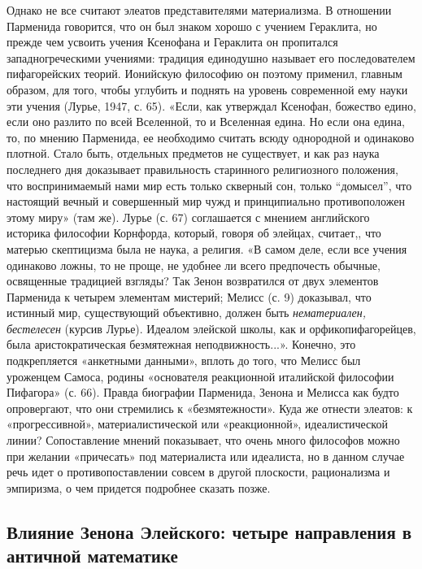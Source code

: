 Однако  не   все  считают  элеатов  представителями   материализма.  В
отношении  Парменида говорится,  что он  был знаком  хорошо с  учением
Гераклита,  но прежде  чем  усвоить учения  Ксенофана  и Гераклита  он
пропитался  западногреческими учениями:  традиция единодушно  называет
его  последователем  пифагорейских   теорий.  Ионийскую  философию  он
поэтому применил, главным образом, для  того, чтобы углубить и поднять
на  уровень современной  ему науки  эти учения  (Лурье, 1947,  с. 65).
«Если, как  утверждал Ксенофан,  божество едино,  если оно  разлито по
всей  Вселенной, то  и  Вселенная едина.  Но если  она  едина, то,  по
мнению Парменида,  ее необходимо считать всюду  однородной и одинаково
плотной.  Стало быть,  отдельных предметов  не существует,  и как  раз
наука последнего  дня доказывает правильность  старинного религиозного
положения,  что  воспринимаемый нами  мир  есть  только скверный  сон,
только  ``домысел'',  что  настоящий  вечный и  совершенный  мир  чужд
и  принципиально  противоположен  этому  миру»  (там  же).  Лурье  (с.
67) соглашается  с мнением  английского историка  философии Корнфорда,
который, говоря об элейцах, считает,,  что матерью скептицизма была не
наука,  а религия.  «В самом  деле, если  все учения  одинаково ложны,
то  не проще,  не  удобнее ли  всего  предпочесть обычные,  освященные
традицией взгляды? Так Зенон возвратился от двух элементов Парменида к
четырем элементам мистерий; Мелисс (с. 9) доказывал, что истинный мир,
существующий объективно,  должен быть  \emph{нематериален, бестелесен}
(курсив  Лурье). Идеалом  элейской  школы,  как и  орфикопифагорейцев,
была  аристократическая  безмятежная неподвижность...».  Конечно,  это
подкрепляется  «анкетными данными»,  вплоть  до того,  что Мелисс  был
уроженцем Самоса, родины  «основателя реакционной италийской философии
Пифагора»  (с.  66).  Правда  биографии Парменида,  Зенона  и  Мелисса
как  будто   опровергают,  что   они  стремились   к  «безмятежности».
Куда  же   отнести  элеатов:  к   «прогрессивной»,  материалистической
или   «реакционной»,  идеалистической   линии?  Сопоставление   мнений
показывает, что  очень много  философов можно при  желании «причесать»
под  материалиста  или  идеалиста,  но   в  данном  случае  речь  идет
о  противопоставлении  совсем  в   другой  плоскости,  рационализма  и
эмпиризма, о чем придется подробнее сказать позже.

\subsection{Влияние  Зенона Элейского:  четыре направления  в античной
математике}

